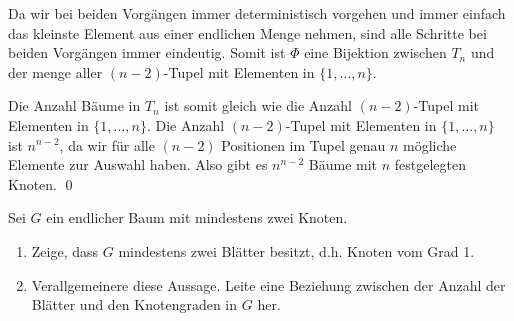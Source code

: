 \documentclass[12pt]{article}
\begin{document}
Da wir bei beiden Vorgängen immer deterministisch vorgehen und immer einfach das kleinste Element aus einer endlichen Menge nehmen, sind alle Schritte bei beiden Vorgängen immer eindeutig. Somit ist $\Phi$ eine Bijektion zwischen $T_n$ und der menge aller $(n-2)$-Tupel mit Elementen in $\{1,\dots,n\}$.

Die Anzahl Bäume in $T_n$ ist somit gleich wie die Anzahl $(n-2)$-Tupel mit Elementen in $\{1,\dots,n\}$. Die Anzahl $(n-2)$-Tupel mit Elementen in $\{1,\dots,n\}$ ist $n^{n-2}$, da wir für alle $(n-2)$ Positionen im Tupel genau $n$ mögliche Elemente zur Auswahl haben. Also gibt es $n^{n-2}$ Bäume mit $n$ festgelegten Knoten. \qed

\begin{problem}{}{}
    Sei $G$ ein endlicher Baum mit mindestens zwei Knoten.
    \begin{enumerate}[label=\alph*)]
        \item Zeige, dass $G$ mindestens zwei Blätter besitzt, d.h. Knoten vom Grad 1.
        \item Verallgemeinere diese Aussage. Leite eine Beziehung zwischen der Anzahl der Blätter und den Knotengraden in $G$ her.
    \end{enumerate}
\end{problem}
\end{document}

